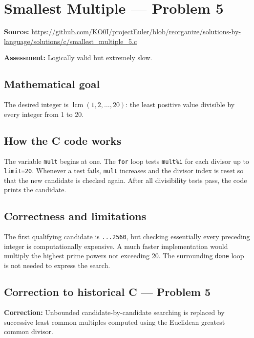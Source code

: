 \section{Smallest Multiple --- Problem 5}
\label{prob:5}
\noindent\textbf{Source:} \url{https://github.com/KO0I/projectEuler/blob/reorganize/solutions-by-language/solutions/c/smallest_multiple_5.c}

\noindent\textbf{Assessment:} Logically valid but extremely slow.

\subsection*{Mathematical goal}
The desired integer is \(\operatorname{lcm}(1,2,\ldots,20)\): the least positive value divisible by every integer from 1 to 20.

\subsection*{How the C code works}
The variable \verb|mult| begins at one. The \verb|for| loop tests \verb|mult%i| for each divisor up to \verb|limit=20|. Whenever a test fails, \verb|mult| increases and the divisor index is reset so that the new candidate is checked again. After all divisibility tests pass, the code prints the candidate.

\subsection*{Correctness and limitations}
The first qualifying candidate is \texttt{...2560}, but checking essentially every preceding integer is computationally expensive. A much faster implementation would multiply the highest prime powers not exceeding 20. The surrounding \verb|done| loop is not needed to express the search.


\subsection*{Correction to historical C --- Problem 5}
{\color{red}\textbf{Correction:} Unbounded candidate-by-candidate searching is replaced by successive least common multiples computed using the Euclidean greatest common divisor.}
